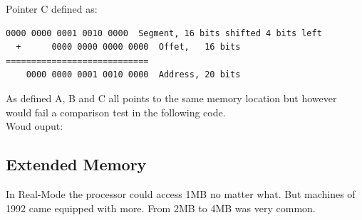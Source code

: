 \documentclass[book.tex]{subfiles}
\begin{document}
\bigskip

Pointer C defined as:
\begin{Verbatim}[fontsize=\relsize{-1}]
    0000 0000 0001 0010 0000  Segment, 16 bits shifted 4 bits left  
  +      0000 0000 0000 0000  Offet,   16 bits
============================
    0000 0000 0001 0010 0000  Address, 20 bits
\end{Verbatim}

As defined A, B and C all points to the same memory location but however would fail a comparison test in the following code.\\



Woud ouput:




\bigskip





  \subsection{Extended Memory}

In Real-Mode the processor could access 1MB no matter what. But machines of 1992 came equipped with more. From 2MB to 4MB was very common. 
\end{document}
